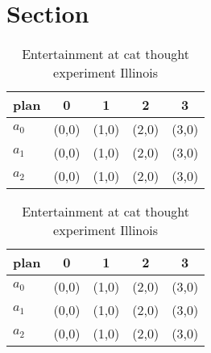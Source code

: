 \documentclass[a4paper]{article}
\begin{document}
\section{Section}

\begin{table}
\begin{adjustbox}{width=0.6\columnwidth}
\begin{tabular}{|l|l|l|l|l|}
\hline
\textbf{plan} & \multicolumn{1}{c|}{\textbf{0}} & \multicolumn{1}{c|}{\textbf{1}} & \multicolumn{1}{c|}{\textbf{2}} & \multicolumn{1}{c|}{\textbf{3}} \\ \hline
\textbf{$a_0$}  & (0,0) & (1,0) & (2,0) & (3,0) \\ \hline
\textbf{$a_1$}  & (0,0) & (1,0) & (2,0) & (3,0) \\ \hline
\textbf{$a_2$}  & (0,0) & (1,0) & (2,0) & (3,0) \\ \hline
\end{tabular}
\end{adjustbox}
\caption{Entertainment at cat thought experiment Illinois 
}
\end{table}

\begin{table}
\begin{adjustbox}{width=0.6\columnwidth}
\begin{tabular}{|l|l|l|l|l|}
\hline
\textbf{plan} & \multicolumn{1}{c|}{\textbf{0}} & \multicolumn{1}{c|}{\textbf{1}} & \multicolumn{1}{c|}{\textbf{2}} & \multicolumn{1}{c|}{\textbf{3}} \\ \hline
\textbf{$a_0$}  & (0,0) & (1,0) & (2,0) & (3,0) \\ \hline
\textbf{$a_1$}  & (0,0) & (1,0) & (2,0) & (3,0) \\ \hline
\textbf{$a_2$}  & (0,0) & (1,0) & (2,0) & (3,0) \\ \hline
\end{tabular}
\end{adjustbox}
\caption{Entertainment at cat thought experiment Illinois 
}
\end{table}
\end{document}
